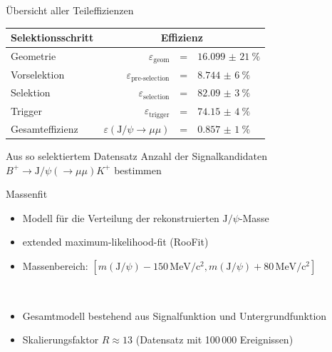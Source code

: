 \begin{frame}[t]{Übersicht aller Teileffizienzen}
  \begin{table}[htb]
    \centering
    \begin{tabular}{lr@{}c@{}l}
      {Selektionsschritt} & \multicolumn{3}{c}{Effizienz} \\
      \toprule
      Geometrie & $\varepsilon_\text{geom}$&=&$\SI{16,099(21)}{\percent}$   \\
      Vorselektion & $\varepsilon_\text{pre-selection}$&=&$\SI{8,744(6)}{\percent}$   \\
      Selektion & $\varepsilon_\text{selection}$&=&$\SI{82,09(3)}{\percent}$   \\
      Trigger & $\varepsilon_\text{trigger}$&=&$\SI{74,15(4)}{\percent}$   \\
      \midrule
      Gesamteffizienz & $\varepsilon(\text{J}/\psi\rightarrow\mu\mu)$&=&$\SI{0,857(1)}{\percent}$   \\
      \bottomrule
    \end{tabular}
  \end{table} \pause
  \centering
  Aus so selektiertem Datensatz Anzahl der Signalkandidaten $B^+\rightarrow\text{J}/\psi(\rightarrow\mu\mu)K^+$ bestimmen
\end{frame}

\begin{frame}[t]{Massenfit}
  \begin{itemize} \setlength\itemsep{0.4cm}
    \item Modell für die Verteilung der rekonstruierten $\text{J}/\psi$-Masse
    \item extended maximum-likelihood-fit (RooFit)
    \item Massenbereich: $[m(\text{J}/\psi)-150\,\text{MeV}/\text{c}^2, m(\text{J}/\psi)+80\,\text{MeV}/\text{c}^2]$
  \end{itemize}
  \ \\
  \begin{itemize} \setlength\itemsep{0.4cm}
    \item Gesamtmodell bestehend aus Signalfunktion und Untergrundfunktion
    \item Skalierungsfaktor $R\approx 13$ (\leadsto Datensatz mit 100\,000 Ereignissen)
  \end{itemize}
\end{frame}

